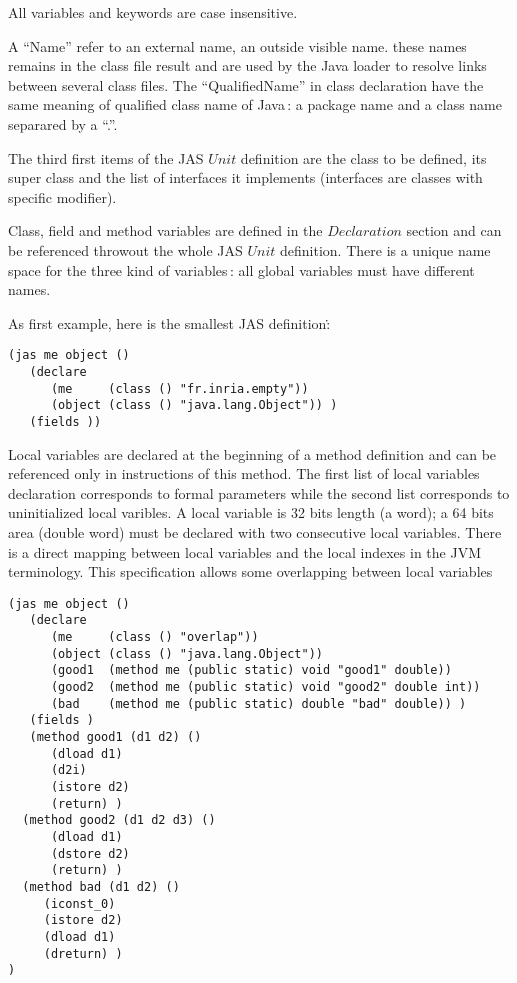 \documentclass{article}
\begin{document}
All variables and keywords are case insensitive.

A ``Name'' refer to an external name, an outside visible name. these
names remains in the class file result and are used by the Java loader
to resolve links between several class files. The ``QualifiedName''
in class declaration have the same meaning of qualified class name of
Java\,: a package name and a class name separared by a ``.''.

The third first items of the JAS $Unit$ definition are the class to
be defined, its super class and the list of interfaces it implements
(interfaces are classes with specific modifier).

Class, field and method variables are defined in the $Declaration$ section
and can be referenced throwout the whole JAS $Unit$ definition. There is
a unique name space for the three kind of variables\,: all global
variables must have different names.

As first example, here is the smallest JAS definition\.:
\begin{verbatim}
(jas me object ()
   (declare
      (me     (class () "fr.inria.empty"))
      (object (class () "java.lang.Object")) )
   (fields ))
\end{verbatim}


Local variables are declared at the beginning of a method definition
and can be referenced only in instructions of this method.
The first list of local variables declaration corresponds to
formal parameters while the second list corresponds to uninitialized
local varibles. A local variable is 32 bits length (a word); a 64
bits area (double word) must be declared with two consecutive local
variables. There is a direct mapping between local variables and
the local indexes in the JVM terminology. This specification allows
some overlapping between local variables

\begin{verbatim}
(jas me object ()
   (declare
      (me     (class () "overlap"))
      (object (class () "java.lang.Object"))
      (good1  (method me (public static) void "good1" double))
      (good2  (method me (public static) void "good2" double int))
      (bad    (method me (public static) double "bad" double)) )
   (fields )
   (method good1 (d1 d2) ()
      (dload d1)
      (d2i)
      (istore d2)
      (return) )
  (method good2 (d1 d2 d3) ()
      (dload d1)
      (dstore d2)
      (return) )
  (method bad (d1 d2) ()
     (iconst_0)
     (istore d2)
     (dload d1)
     (dreturn) )
)
\end{verbatim}
\end{document}
